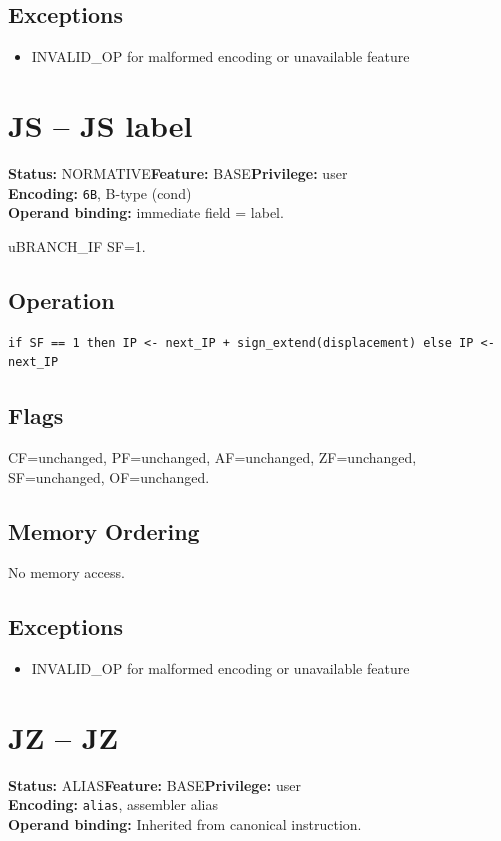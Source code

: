 \documentclass[10pt]{article}
\begin{document}
\subsection*{Exceptions}
\begin{itemize}
\item INVALID\_OP for malformed encoding or unavailable feature
\end{itemize}
\clearpage

\section{JS -- JS label}
\textbf{Status:} NORMATIVE\quad \textbf{Feature:} BASE\quad \textbf{Privilege:} user\\
\textbf{Encoding:} \texttt{6B}, B-type (cond)\\
\textbf{Operand binding:} immediate field = label.

uBRANCH\_IF SF=1.

\subsection*{Operation}
\begin{lstlisting}
if SF == 1 then IP <- next_IP + sign_extend(displacement) else IP <- next_IP
\end{lstlisting}
\subsection*{Flags}
CF=unchanged, PF=unchanged, AF=unchanged, ZF=unchanged, SF=unchanged, OF=unchanged.
\subsection*{Memory Ordering}
No memory access.
\subsection*{Exceptions}
\begin{itemize}
\item INVALID\_OP for malformed encoding or unavailable feature
\end{itemize}
\clearpage

\section{JZ -- JZ}
\textbf{Status:} ALIAS\quad \textbf{Feature:} BASE\quad \textbf{Privilege:} user\\
\textbf{Encoding:} \texttt{alias}, assembler alias\\
\textbf{Operand binding:} Inherited from canonical instruction.
\end{document}
